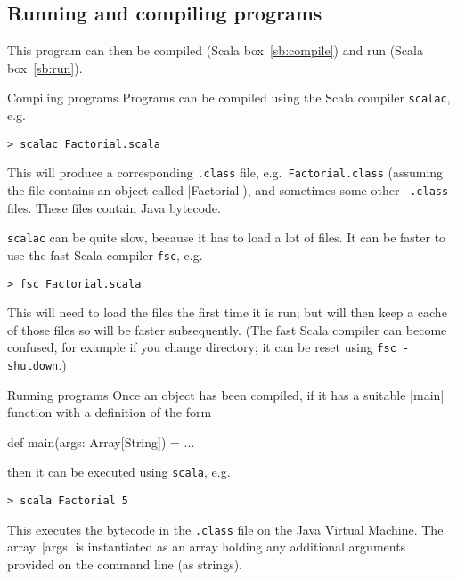 \pagebreak[4]
\subsection*{Running and compiling programs}

This program can then be compiled (Scala box~\ref{sb:compile}) and run (Scala
box~\ref{sb:run}).

\begin{scalaBox}{Compiling programs}
\def\prog#1{{\codecolour\tt #1}}
\label{sb:compile}
Programs can be compiled using the Scala compiler {\codecolour\tt scalac},
e.g.  {\codecolour
\begin{verbatim}
> scalac Factorial.scala
\end{verbatim}
}%
\noindent This will produce a corresponding \texttt{\codecolour .class} file,
e.g.~\texttt{\codecolour Factorial.class} (assuming the file contains an
object called |Factorial|), and sometimes some other \texttt{\codecolour
  .class} files.  These files contain Java bytecode.

{\codecolour\tt scalac} can be quite slow, because it has to load a lot of
files.  It can be faster to use the fast Scala compiler {\codecolour\tt fsc},
e.g.  {\codecolour
\begin{verbatim}
> fsc Factorial.scala
\end{verbatim}
}%
This will need to load the files the first time it is run; but will then keep
a cache of those files so will be faster subsequently.  (The fast Scala
compiler can become confused, for example if you change directory; it can be
reset using \prog{fsc -shutdown}.)
\end{scalaBox}


\begin{scalaBox}{Running programs}
\label{sb:run}
Once an object has been compiled, if it has a suitable |main| function with a definition of the form%
% 
\begin{scala}
  def main(args: Array[String]) = ...
\end{scala}
%
then it can be executed using \texttt{\codecolour scala}, e.g.  {\codecolour
\begin{verbatim}
> scala Factorial 5
\end{verbatim}
}%
\noindent
This executes the bytecode in the \texttt{\codecolour .class} file on the
Java Virtual Machine.
The array~|args| is instantiated as an array holding any additional arguments
provided on the command line (as strings). 
\end{scalaBox}

